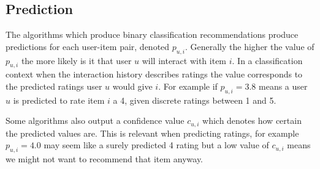 
\subsection{Prediction}\label{sec:background:theory:pred}

The algorithms which produce binary classification recommendations produce predictions for each user-item pair, denoted $p_{u, i}$. Generally the higher the value of $p_{u, i}$ the more likely is it that user $u$ will interact with item $i$. In a classification context when the interaction history describes ratings the value corresponds to the predicted ratings user $u$ would give $i$. For example if $p_{u, i} = 3.8$ means a user $u$ is predicted to rate item $i$ a 4, given discrete ratings between 1 and 5.

Some algorithms also output a confidence value $c_{u, i}$ which denotes how certain the predicted values are. This is relevant when predicting ratings, for example $p_{u, i} = 4.0$ may seem like a surely predicted 4 rating but a low value of $c_{u, i}$ means we might not want to recommend that item anyway.

